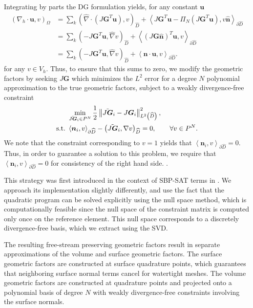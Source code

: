 \documentclass[preprint,10pt]{article}
\theoremstyle{definition}
\theoremstyle{lemma}
\theoremstyle{theorem}
\theoremstyle{assumption}
\renewcommand{\hat}{\widehat}
\newcommand{\nor}[1]{\left\| #1 \right\|}
\newcommand{\LRp}[1]{\left( #1 \right)}
\newcommand{\LRa}[1]{\left\langle #1 \right\rangle}
\newcommand{\Grad} {\ensuremath{\nabla}}
\newcommand{\note}[1]{{\color{blue}{#1}}}
\renewcommand{\d}{\partial}
\begin{document}
{Integrating by parts the DG formulation yields, for any constant $\bm{u}$
\begin{align*}
\LRp{\Grad_h \cdot \bm{u},v}_{\Omega} &= \sum_k \LRp{\hat{\Grad} \cdot \LRp{J\bm{G}^T\bm{u}},v }_{\hat{D}} + \LRa{J\bm{G}^T\bm{u} - \Pi_N \LRp{J\bm{G}^T\bm{u}}, v \hat{\bm{n}}}_{\d \hat{D}}\\
&= \sum_k \LRp{-J\bm{G}^T\bm{u},\hat{\Grad} v }_{\hat{D}} + \LRa{\LRp{J\bm{G}\hat{\bm{n}}}^T\bm{u}, v }_{\d \hat{D}}\\
&= \sum_k \LRp{-J\bm{G}^T\bm{u},\hat{\Grad} v }_{\hat{D}} + \LRa{\bm{n}\cdot \bm{u}, v }_{\d \hat{D}}.  
\end{align*}
for any $v\in V_h$.  
Thus, to ensure that this sums to zero, we modify the geometric factors by seeking $J\bm{G}$ which minimizes the $L^2$ error for a degree $N$ polynomial approximation to the true geometric factors, subject to a weakly divergence-free constraint
\begin{align*}
&\min_{\tilde{J\bm{G}}_i \in P^N} \frac{1}{2}\nor{\tilde{J\bm{G}}_i - J\bm{G}_i}_{L^2\LRp{\hat{D}}}^2,\\ 
{\rm s.t.\ } &\LRa{\bm{n}_i,v}_{\d \hat{D}}-\LRp{\tilde{J\bm{G}}_i,\Grad v}_{\hat{D}} = 0, \qquad \forall v\in P^N.
\end{align*}
We note that the constraint corresponding to $v = 1$ yields that $\LRa{\bm{n}_i,v}_{\d \hat{D}} = 0$.  Thus, in order to guarantee a solution to this problem, we require that $\LRa{\bm{n}_i,v}_{\d \hat{D}} = 0$ for consistency of the right hand side.  \note{Clarify when this is satisfied!!}.

This strategy was first introduced in the context of SBP-SAT terms in \cite{fernandez2016simultaneous}.  We approach its implementation slightly differently, and use the fact that the quadratic program can be solved explicitly using the null space method, which is computationally feasible since the null space of the constraint matrix is computed only once on the reference element.  This null space corresponds to a discretely divergence-free basis, which we extract using the SVD.  

The resulting free-stream preserving geometric factors result in separate approximations of the volume and surface geometric factors.  The surface geometric factors are constructed at surface quadrature points, which guarantees that neighboring surface normal terms cancel for watertight meshes.  The volume geometric factors are constructed at quadrature points and projected onto a polynomial basis of degree $N$ with weakly divergence-free constraints involving the surface normals.



}
\end{document}

